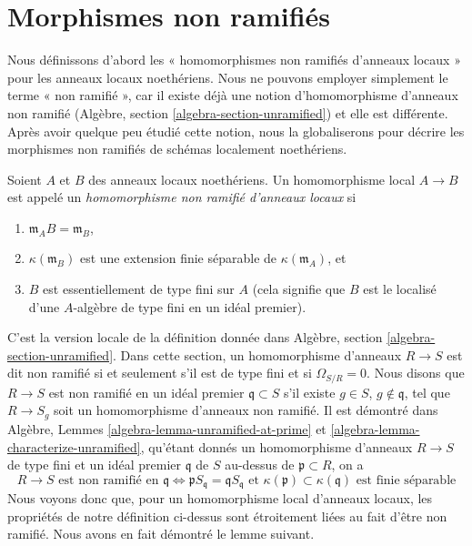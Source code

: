 \section{Morphismes non ramifiés}
\label{section-unramified-definition}

\noindent
Nous définissons d'abord les « homomorphismes non ramifiés d'anneaux locaux » pour les anneaux
locaux noethériens. Nous ne pouvons employer simplement le terme « non ramifié », car il existe déjà
une notion
d'homomorphisme d'anneaux non ramifié (Algèbre, section \ref{algebra-section-unramified})
et elle est différente. Après avoir quelque peu étudié cette notion, nous
la globaliserons pour décrire les morphismes non ramifiés de schémas localement noethériens.

\begin{definition}
\label{definition-unramified-rings}
Soient $A$ et $B$ des anneaux locaux noethériens. Un homomorphisme local $A \to B$
est appelé un {\it homomorphisme non ramifié d'anneaux locaux} si
\begin{enumerate}
\item $\mathfrak m_AB = \mathfrak m_B$,
\item $\kappa(\mathfrak m_B)$ est une extension finie séparable de
$\kappa(\mathfrak m_A)$, et
\item $B$ est essentiellement de type fini sur $A$ (cela signifie
que $B$ est le localisé d'une $A$-algèbre de type fini en un idéal premier).
\end{enumerate}
\end{definition}

\noindent
C'est la version locale de la
définition donnée dans Algèbre, section \ref{algebra-section-unramified}.
Dans cette section, un homomorphisme d'anneaux $R \to S$ est dit non ramifié si et
seulement s'il est de type fini et si $\Omega_{S/R} = 0$.
Nous disons que $R \to S$ est non ramifié en un idéal premier $\mathfrak q \subset S$
s'il existe $g \in S$, $g \not \in \mathfrak q$, tel que
$R \to S_g$ soit un homomorphisme d'anneaux non ramifié. Il est démontré dans
Algèbre, Lemmes \ref{algebra-lemma-unramified-at-prime} et
\ref{algebra-lemma-characterize-unramified}, qu'étant donnés un homomorphisme
d'anneaux $R \to S$ de type fini et un idéal premier $\mathfrak q$ de $S$
au-dessus de $\mathfrak p \subset R$, on a
$$
R \to S\text{ est non ramifié en }\mathfrak q
\Leftrightarrow
\mathfrak pS_{\mathfrak q} = \mathfrak q S_{\mathfrak q}
\text{ et }
\kappa(\mathfrak p) \subset \kappa(\mathfrak q)\text{ est finie séparable}
$$
Nous voyons donc que, pour un homomorphisme local d'anneaux locaux, les propriétés
de notre définition ci-dessus sont étroitement liées au fait
d'être non ramifié. Nous avons en fait démontré le lemme suivant.

